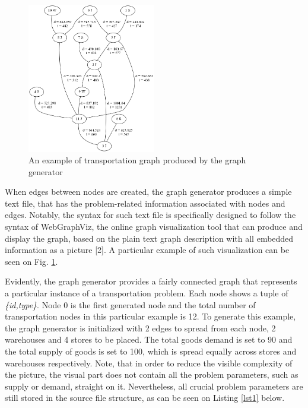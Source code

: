 \documentclass[journal,onecolumn]{IEEEtran}
\begin{document}
\begin{figure}[h]
	\centering
  	\includegraphics[width=0.5\textwidth]{img/img1.png}
  	\caption{An example of transportation graph produced by the graph generator}	
  	\label{fig:img1}
\end{figure}

When edges between nodes are created, the graph generator produces a simple text file, that has the problem-related information associated with nodes and edges. Notably, the syntax for such text file is specifically designed to follow the syntax of WebGraphViz, the online graph visualization tool that can produce and display the graph, based on the plain text graph description with all embedded information as a picture [2]. A particular example of such visualization can be seen on Fig. \ref{fig:img1}.



Evidently, the graph generator provides a fairly connected graph that represents a particular instance of a transportation problem. Each node shows a tuple of \textit{\{id,type\}}. Node 0 is the first generated node and the total number of transportation nodes in this particular example is 12. To generate this example, the graph generator is initialized with 2 edges to spread from each node, 2 warehouses and 4 stores to be placed. The total goods demand is set to 90 and the total supply of goods is set to 100, which is spread equally across stores and warehouses respectively. Note, that in order to reduce the visible complexity of the picture, the visual part does not contain all the problem parameters, such as supply or demand, straight on it. Nevertheless, all crucial problem parameters are still stored in the source file structure, as can be seen on Listing \ref{lst1} below.

\lstset{basicstyle=\ttfamily}

\end{document}
